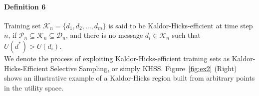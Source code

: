 \paragraph*{\bf{Definition 6}} Training set $\mathcal{K}_n=\{d_1, d_2, \ldots, d_m\}$ is said to be Kaldor-Hicks-efficient at time step $n$, if $\mathcal{P}_n\subseteq\mathcal{K}_n\subseteq\mathcal{D}_n$, and there is no message $d_i\in\mathcal{K}_n$ such that $U(d^*)>U(d_i)$.\\

We denote the process of exploiting Kaldor-Hicks-efficient training sets as
Kaldor-Hicks-Efficient Selective Sampling, or simply KHSS. Figure~\ref{fig:ex2} (Right) shows an illustrative example of a Kaldor-Hicks region built from arbitrary points in the utility space.

%
%
